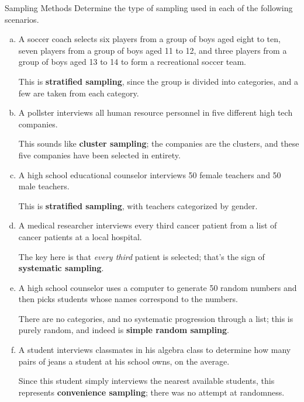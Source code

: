 \begin{example}{Sampling Methods}
Determine the type of sampling used in each of the following scenarios.

\begin{enumerate}[(a)]
\item A soccer coach selects six players from a group of boys aged eight to ten, seven players from a group of boys aged 11 to 12, and three players from a group of boys aged 13 to 14 to form a recreational soccer team.

\sol
This is \textbf{stratified sampling}, since the group is divided into categories, and a few are taken from each category.

\solline
\item A pollster interviews all human resource personnel in five different high tech companies.

\sol
This sounds like \textbf{cluster sampling}; the companies are the clusters, and these five companies have been selected in entirety.

\solline
\item A high school educational counselor interviews 50 female teachers and 50 male teachers.

\sol
This is \textbf{stratified sampling}, with teachers categorized by gender.

\solline
\item A medical researcher interviews every third cancer patient from a list of cancer patients at a local hospital.

\sol
The key here is that \emph{every third} patient is selected; that's the sign of \textbf{systematic sampling}.

\solline
\item A high school counselor uses a computer to generate 50 random numbers and then picks students whose names correspond to the numbers.

\sol
There are no categories, and no systematic progression through a list; this is purely random, and indeed is \textbf{simple random sampling}.

\solline
\item A student interviews classmates in his algebra class to determine how many pairs of jeans a student at his school owns, on the average.

\sol
Since this student simply interviews the nearest available students, this represents \textbf{convenience sampling}; there was no attempt at randomness.
\end{enumerate}
\end{example}
\pagebreak

